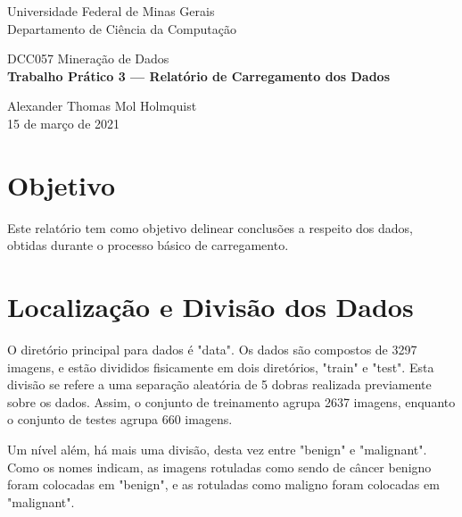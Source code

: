 \documentclass[12pt,oneside,a4paper]{article}
\begin{document}
\begin{titlepage}
\enlargethispage{\footskip}
\setlength{\parindent}{0pt}

\begin{center}
    \onehalfspacing
    \Large Universidade Federal de Minas Gerais
    \\ Departamento de Ciência da Computação
    
    \vspace{80mm}
    
    \Large{DCC057 Mineração de Dados}
    \\ \Large \textbf{Trabalho Prático 3 --- Relatório de Carregamento dos Dados}
    
\end{center}

\vspace{\fill}

\begin{minipage}[b]{\textwidth}
    \centering
    \onehalfspacing
    \large
    Alexander Thomas Mol Holmquist \\
    15 de março de 2021

\end{minipage}

\end{titlepage}

\justify

\section{Objetivo}

Este relatório tem como objetivo delinear conclusões a respeito dos dados, obtidas durante o processo básico de carregamento.

\section{Localização e Divisão dos Dados}

O diretório principal para dados é "data". Os dados são compostos de 3297 imagens, e estão divididos fisicamente em dois diretórios, "train" e "test". Esta divisão se refere a uma separação aleatória de 5 dobras realizada previamente sobre os dados. Assim, o conjunto de treinamento agrupa 2637 imagens, enquanto o conjunto de testes agrupa 660 imagens.

Um nível além, há mais uma divisão, desta vez entre "benign" e "malignant". Como os nomes indicam, as imagens rotuladas como sendo de câncer benigno foram colocadas em "benign", e as rotuladas como maligno foram colocadas em "malignant".
\end{document}
